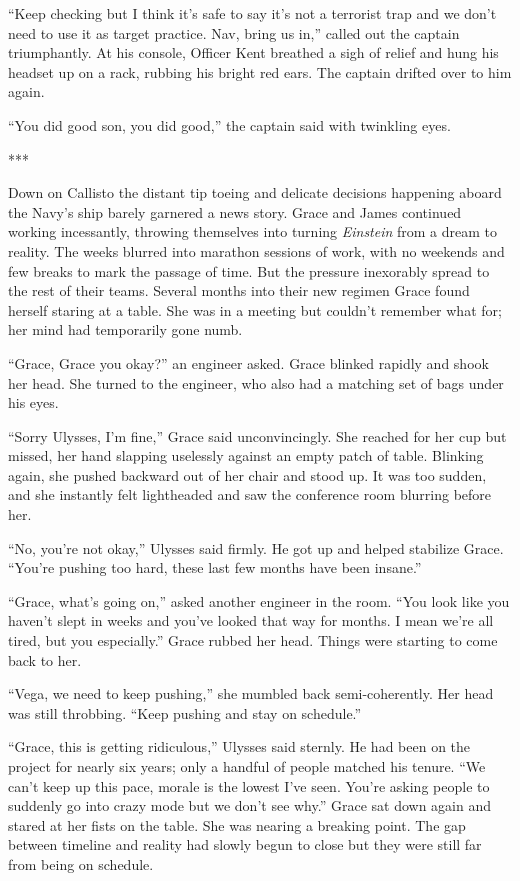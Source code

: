 \documentclass[openany, 12pt]{book} %
\begin{document}
``Keep checking but I think it's safe to say it's not a terrorist trap and we don't need to use it as target practice. Nav, bring us in,'' called out the captain triumphantly. At his console, Officer Kent breathed a sigh of relief and hung his headset up on a rack, rubbing his bright red ears. The captain drifted over to him again.

``You did good son, you did good,'' the captain said with twinkling eyes.

\begin{center}
***
\end{center}

Down on Callisto the distant tip toeing and delicate decisions happening aboard the Navy's ship barely garnered a news story. Grace and James continued working incessantly, throwing themselves into turning \textit{Einstein} from a dream to reality. The weeks blurred into marathon sessions of work, with no weekends and few breaks to mark the passage of time. But the pressure inexorably spread to the rest of their teams. Several months into their new regimen Grace found herself staring at a table. She was in a meeting but couldn't remember what for; her mind had temporarily gone numb.

``Grace, Grace you okay?'' an engineer asked. Grace blinked rapidly and shook her head. She turned to the engineer, who also had a matching set of bags under his eyes.

``Sorry Ulysses, I'm fine,'' Grace said unconvincingly. She reached for her cup but missed, her hand slapping uselessly against an empty patch of table. Blinking again, she pushed backward out of her chair and stood up. It was too sudden, and she instantly felt lightheaded and saw the conference room blurring before her.

``No, you're not okay,'' Ulysses said firmly. He got up and helped stabilize Grace. ``You're pushing too hard, these last few months have been insane.''

``Grace, what's going on,'' asked another engineer in the room. ``You look like you haven't slept in weeks and you've looked that way for months. I mean we're all tired, but you especially.'' Grace rubbed her head. Things were starting to come back to her.

``Vega, we need to keep pushing,'' she mumbled back semi-coherently. Her head was still throbbing. ``Keep pushing and stay on schedule.''

``Grace, this is getting ridiculous,'' Ulysses said sternly. He had been on the project for nearly six years; only a handful of people matched his tenure.  ``We can't keep up this pace, morale is the lowest I've seen. You're asking people to suddenly go into crazy mode but we don't see why.'' Grace sat down again and stared at her fists on the table. She was nearing a breaking point. The gap between timeline and reality had slowly begun to close but they were still far from being on schedule.
\end{document}
